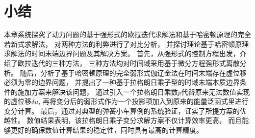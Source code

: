 \section{小结}

本章系统探究了动力问题的基于强形式的欧拉迭代求解法和基于哈密顿原理的完全若新式求解法，
对两种方法的利弊进行了对比分析，
并探讨理论基于哈密顿原理求解法的时间末端边界问题及其解决方案。
首先，从强形式的控制方程出发，介绍了欧拉迭代的三种方法，
三种方法均对时间域采用基于微分方程强形式离散分析。
随后，分析了基于哈密顿原理的完全弱形式伽辽金法在时间末端存在虚位移必须为零的边界问题，
并提出了一种基于拉格朗日乘子型的时域未端本质边界条件的施加方案来解决该问题，
通过引入一个拉格朗日乘数$p$代替原来无法数值实现的虚位移$\delta u$,
再将变分后的弱形式作为一个投影项加入到原来的能量泛函式里进行变分计算。
最后，通过对典型的弹簧小车算例的系统验证，证实了所提方案的优越性。
数值结果表明，该拉格朗日乘子变分求解方案不仅计算效率更高，
而且能够更好的确保数值计算结果的稳定性，同时具有最高的计算精度。